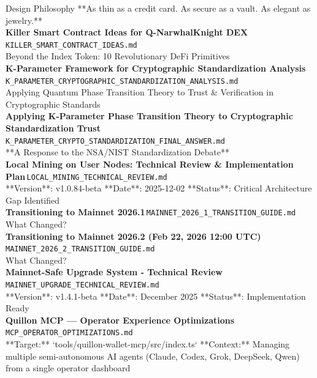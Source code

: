 \documentclass[11pt,a4paper]{article}
\begin{document}
Design Philosophy **As thin as a credit card. As secure as a vault. As elegant as jewelry.**\\[6pt]
\noindent\textbf{Killer Smart Contract Ideas for Q-NarwhalKnight DEX}\,\textcolor{qgray}{\small \texttt{KILLER\_SMART\_CONTRACT\_IDEAS.md}}\\
Beyond the Index Token: 10 Revolutionary DeFi Primitives\\[6pt]
\noindent\textbf{K-Parameter Framework for Cryptographic Standardization Analysis}\,\textcolor{qgray}{\small \texttt{K\_PARAMETER\_CRYPTOGRAPHIC\_STANDARDIZATION\_ANALYSIS.md}}\\
Applying Quantum Phase Transition Theory to Trust \& Verification in Cryptographic Standards\\[6pt]
\noindent\textbf{Applying K-Parameter Phase Transition Theory to Cryptographic Standardization Trust}\,\textcolor{qgray}{\small \texttt{K\_PARAMETER\_CRYPTO\_STANDARDIZATION\_FINAL\_ANSWER.md}}\\
**A Response to the NSA/NIST Standardization Debate**\\[6pt]
\noindent\textbf{Local Mining on User Nodes: Technical Review \& Implementation Plan}\,\textcolor{qgray}{\small \texttt{LOCAL\_MINING\_TECHNICAL\_REVIEW.md}}\\
**Version**: v1.0.84-beta **Date**: 2025-12-02 **Status**: Critical Architecture Gap Identified\\[6pt]
\noindent\textbf{Transitioning to Mainnet 2026.1}\,\textcolor{qgray}{\small \texttt{MAINNET\_2026\_1\_TRANSITION\_GUIDE.md}}\\
What Changed?\\[6pt]
\noindent\textbf{Transitioning to Mainnet 2026.2 (Feb 22, 2026 12:00 UTC)}\,\textcolor{qgray}{\small \texttt{MAINNET\_2026\_2\_TRANSITION\_GUIDE.md}}\\
What Changed?\\[6pt]
\noindent\textbf{Mainnet-Safe Upgrade System - Technical Review}\,\textcolor{qgray}{\small \texttt{MAINNET\_UPGRADE\_TECHNICAL\_REVIEW.md}}\\
**Version**: v1.4.1-beta **Date**: December 2025 **Status**: Implementation Ready\\[6pt]
\noindent\textbf{Quillon MCP --- Operator Experience Optimizations}\,\textcolor{qgray}{\small \texttt{MCP\_OPERATOR\_OPTIMIZATIONS.md}}\\
**Target:** `tools/quillon-wallet-mcp/src/index.ts` **Context:** Managing multiple semi-autonomous AI agents (Claude, Codex, Grok, DeepSeek, Qwen) from a single operator dashboard\\[6pt]
\end{document}
